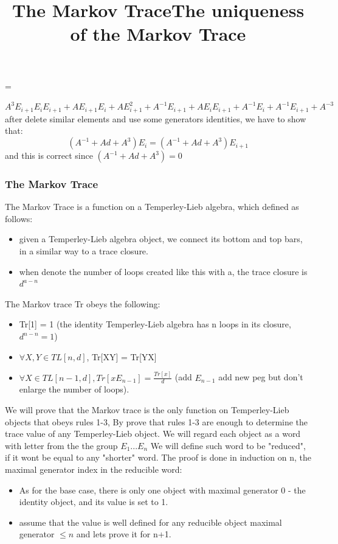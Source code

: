 \documentclass{article}
\begin{document}
=

$
A^{3}E_{i+1}E_{i}E_{i+1} +AE_{i+1}E_{i} + AE_{i+1}^{2} + A^{-1}E_{i+1} +AE_{i}E_{i+1}+A^{-1}E_{i} + A^{-1}E_{i+1} + A^{-3}
$
after delete similar elements and use some generators identities, we have to show that:
\begin{displaymath}
(A^{-1}+Ad+A^{3})E_{i}= (A^{-1}+Ad+A^{3})E_{i+1}
\end{displaymath}
and this is correct since $(A^{-1}+Ad+A^{3}) = 0$



\subsubsection{The Markov Trace}
\title{The Markov Trace}
The Markov Trace is a function on a Temperley-Lieb algebra, which defined as follows:
\begin{itemize}
\item given a Temperley-Lieb algebra object, we connect its bottom and top bars, in a similar way to
a trace closure.
\item when denote the number of loops created like this with a, the trace closure is $d^{a-n}$
\end{itemize}
The Markov trace Tr obeys the following:
\begin{itemize}
\item Tr[1] = 1 (the identity Temperley-Lieb algebra has n loops in its closure, $d^{n-n} = 1$)
\item $\forall X,Y \in TL[n,d]$, Tr[XY] = Tr[YX] 
\item $\forall X \in TL[n-1, d], Tr[xE_{n-1}]=\frac{Tr[x]}{d}$ (add $E_{n-1}$ add new peg but don't enlarge the number of loops).
\end{itemize}


\title{The uniqueness of the Markov Trace}
We will prove that the Markov trace is the only function on Temperley-Lieb objects that obeys rules 1-3,
By prove that rules 1-3 are enough to determine the trace value of any Temperley-Lieb object.
We will regard each object as a word with letter from the the group $E_{1}...E_{n}$
We will define such word to be "reduced", if it wont be equal to any "shorter" word.
The proof is done in induction on n, the maximal generator index in the reducible word:
\begin{itemize}
\item As for the base case, there is only one object with maximal generator 0 - the identity object, and its value is set to 1.
\item assume that the value is well defined for any reducible object maximal generator $\leq n$ and lets prove it for n+1. 
\end{itemize}
\end{document}
